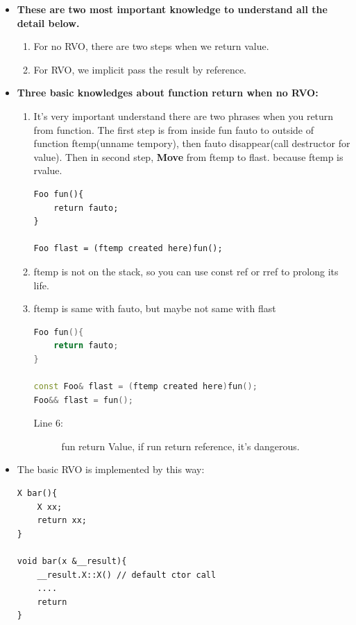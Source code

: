 \documentclass[a4paper,11pt,twoside]{book}
\begin{document}
\begin{itemize}
	\item \textbf{These are two most important knowledge to understand all the detail below.}
	\begin{enumerate}
		\item For no RVO, there are two steps when we return value.
		\item For RVO, we implicit pass the result by reference.
	\end{enumerate}
	
	\item \textbf{Three basic knowledges about function return when no RVO:}
	\begin{enumerate}
		\item It's very important understand there are two phrases when you return from function. The first step  is from inside fun fauto to outside of function ftemp(unname tempory), then fauto disappear(call destructor for value).  Then in second step, \textbf{Move} from ftemp to flast. because ftemp is rvalue.
\begin{lstlisting}[numbers=none]
Foo fun(){
	return fauto;
}
		
Foo flast = (ftemp created here)fun();
\end{lstlisting}
		\item ftemp is not on the stack, so you can use const ref or rref to prolong its life.
		
		\item ftemp is same with fauto, but maybe not same with flast
\begin{lstlisting}[frame=single, language=c++]
Foo fun(){
	return fauto;
}
		
const Foo& flast = (ftemp created here)fun();
Foo&& flast = fun();
\end{lstlisting}
\begin{description}
	\item[Line 6:] fun return Value, if run return reference, it's dangerous.
\end{description}

	\end{enumerate}
	
	\item The basic RVO is implemented by this way:
\begin{lstlisting}[numbers=none]
X bar(){
	X xx;
	return xx;
}
	
void bar(x &__result){
	__result.X::X() // default ctor call
	....
	return
}
\end{lstlisting}
	
\end{itemize}
\end{document}
